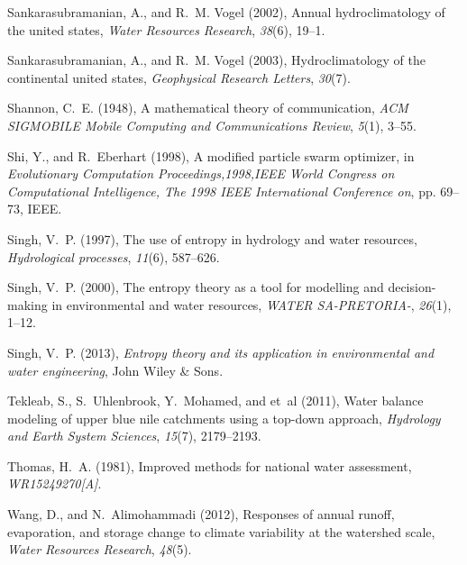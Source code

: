\documentclass[draft,wrr]{AGUTeX}
\begin{document}
\begin{article}
\begin{thebibliography}{59}
Sankarasubramanian, A., and R.~M. Vogel (2002), Annual hydroclimatology of the
  united states, \textit{Water Resources Research}, \textit{38}(6), 19--1.

Sankarasubramanian, A., and R.~M. Vogel (2003), Hydroclimatology of the
  continental united states, \textit{Geophysical Research Letters},
  \textit{30}(7).

Shannon, C.~E. (1948), A mathematical theory of communication, \textit{ACM
  SIGMOBILE Mobile Computing and Communications Review}, \textit{5}(1), 3--55.

Shi, Y., and R.~Eberhart (1998), A modified particle swarm optimizer, in
  \textit{Evolutionary Computation Proceedings,1998,IEEE World Congress on
  Computational Intelligence, The 1998 IEEE International Conference on}, pp.
  69--73, IEEE.

Singh, V.~P. (1997), The use of entropy in hydrology and water resources,
  \textit{Hydrological processes}, \textit{11}(6), 587--626.

Singh, V.~P. (2000), The entropy theory as a tool for modelling and
  decision-making in environmental and water resources, \textit{WATER
  SA-PRETORIA-}, \textit{26}(1), 1--12.

Singh, V.~P. (2013), \textit{Entropy theory and its application in
  environmental and water engineering}, John Wiley \& Sons.

Tekleab, S., S.~Uhlenbrook, Y.~Mohamed, and et~al (2011), Water balance
  modeling of upper blue nile catchments using a top-down approach,
  \textit{Hydrology and Earth System Sciences}, \textit{15}(7), 2179--2193.

Thomas, H.~A. (1981), Improved methods for national water assessment,
  \textit{WR15249270[A]}.

Wang, D., and N.~Alimohammadi (2012), Responses of annual runoff, evaporation,
  and storage change to climate variability at the watershed scale,
  \textit{Water Resources Research}, \textit{48}(5).


\end{thebibliography}
\end{article}
\end{document}
